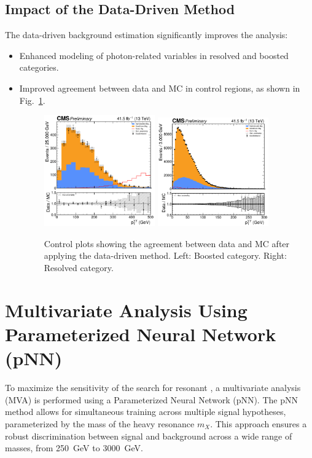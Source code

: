 \subsection{Impact of the Data-Driven Method}
The data-driven background estimation significantly improves the analysis:
\begin{itemize}
    \item Enhanced modeling of photon-related variables in resolved and boosted categories.
    \item Improved agreement between data and MC in control regions, as shown in Fig.~\ref{fig:control_plots}.
        \begin{figure}[!htbp]
            \centering
            \includegraphics[width=0.45\textwidth]{figures/ControlPlots/boosted_PNN_reweighted/PNN_Diphoton_pt_after_reweight.pdf}%
            \includegraphics[width=0.45\textwidth]{figures/ControlPlots/resolved_PNN_reweighted/PNN_Diphoton_pt.pdf}
            \caption{Control plots showing the agreement between data and MC after applying the data-driven method. Left: Boosted category. Right: Resolved category.}
            \label{fig:control_plots}
        \end{figure}
\end{itemize}

\section{Multivariate Analysis Using Parameterized Neural Network (pNN)}
To maximize the sensitivity of the search for resonant \HHWW, a multivariate analysis (MVA) is performed
using a Parameterized Neural Network (pNN). The pNN method allows for simultaneous training across multiple signal hypotheses,
parameterized by the mass of the heavy resonance \(m_X\). This approach ensures a robust discrimination between signal and
background across a wide range of masses, from 250~GeV to 3000~GeV.

